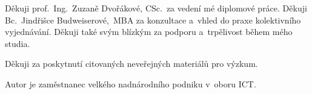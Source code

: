 \begingroup
\setlength{\parskip}{\baselineskip}
\setlength{\parindent}{0pt}

Děkuji prof.~Ing.~Zuzaně Dvořákové, CSc.~za vedení mé diplomové práce. Děkuji Bc.~Jindřišce Budweiserové,~MBA za konzultace a~vhled do praxe kolektivního vyjednávání. Děkuji také svým blízkým za podporu a~trpělivost během mého studia.

Děkuji za poskytnutí citovaných neveřejných materiálů pro výzkum.

Autor je zaměstnanec velkého nadnárodního podniku v~oboru \acs{ICT}.
\endgroup
